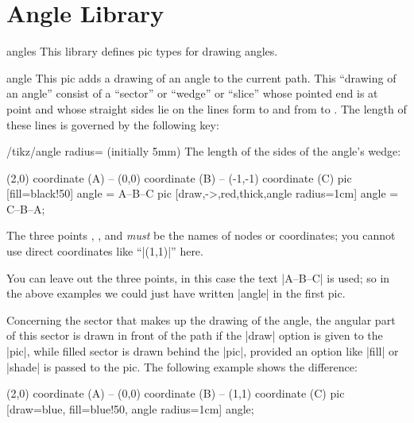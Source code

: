 %
%
%


\section{Angle Library}
\label{section-angle}

\begin{tikzlibrary}{angles}
    This library defines pic types for drawing angles.
\end{tikzlibrary}

\begin{pictype}{angle}{}
    This pic adds a drawing of an angle to the current path. This ``drawing of
    an angle'' consist of a ``sector'' or ``wedge'' or ``slice'' whose pointed
    end is at point  and whose straight sides lie on the lines form
     to  and from  to . The length of these
    lines is governed by the following key:
    \begin{key}{/tikz/angle radius= (initially 5mm)}
        The length of the sides of the angle's wedge:
\begin{codeexample}[]
\tikz \draw (2,0) coordinate (A) -- (0,0) coordinate (B)
         -- (-1,-1) coordinate (C)
           pic [fill=black!50]                      {angle = A--B--C}
           pic [draw,->,red,thick,angle radius=1cm] {angle = C--B--A};
\end{codeexample}
    \end{key}

    The three points , , and  \emph{must} be the names
    of nodes or coordinates; you cannot use direct coordinates like ``|(1,1)|''
    here.

    You can leave out the three points, in this case the text |A--B--C| is
    used; so in the above examples we could just have written |{angle}| in the
    first pic.

    Concerning the sector that makes up the drawing of the angle, the angular
    part of this sector is drawn in front of the path if the |draw| option is
    given to the |pic|, while filled sector is drawn behind the |pic|, provided
    an option like |fill| or |shade| is passed to the pic. The following
    example shows the difference:
\begin{codeexample}[]
\tikz \draw [line width=2mm]
      (2,0) coordinate (A) -- (0,0) coordinate (B)
   -- (1,1) coordinate (C)
     pic [draw=blue, fill=blue!50, angle radius=1cm] {angle};
\end{codeexample}


\end{pictype}
